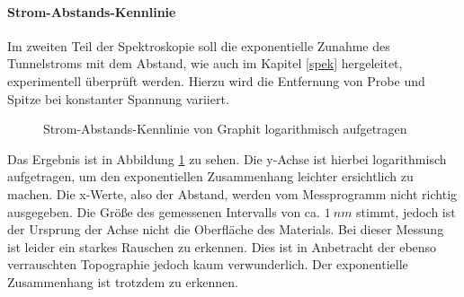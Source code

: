 \paragraph{Strom-Abstands-Kennlinie}
Im zweiten Teil der Spektroskopie soll die exponentielle Zunahme des Tunnelstroms
mit dem Abstand, wie auch im Kapitel \ref{spek} hergeleitet, experimentell 
überprüft werden. Hierzu wird die Entfernung von Probe und Spitze bei konstanter
Spannung variiert. 
\begin{figure}[h]
  \centering
  \caption{Strom-Abstands-Kennlinie von Graphit logarithmisch aufgetragen}
  \label{graphdi}
\end{figure}
Das Ergebnis ist in Abbildung \ref{graphdi} zu sehen. Die y-Achse ist hierbei
logarithmisch aufgetragen, um den exponentiellen Zusammenhang leichter ersichtlich
zu machen. Die x-Werte, also der Abstand, werden vom Messprogramm nicht richtig
ausgegeben. Die Größe des gemessenen Intervalls von ca. $\SI{1}{nm}$ stimmt, 
jedoch ist der Ursprung der Achse nicht die Oberfläche des Materials.
Bei dieser Messung ist leider ein starkes Rauschen zu erkennen. Dies ist in 
Anbetracht der ebenso verrauschten Topographie jedoch kaum verwunderlich.
Der exponentielle Zusammenhang ist trotzdem zu erkennen.

